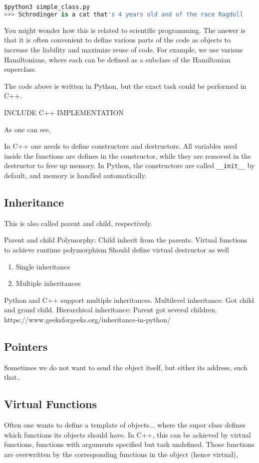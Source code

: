 \lstset{basicstyle=\scriptsize}
\begin{lstlisting}[language=python]
$python3 simple_class.py
>>> Schrodinger is a cat that's 4 years old and of the race Ragdoll
\end{lstlisting}

You might wonder how this is related to scientific programming. The answer is that it is often convenient to define various parts of the code as objects to increase the liability and maximize reuse of code. For example, we use various Hamiltonians, where each can be defined as a subclass of the Hamiltonian superclass. 

The code above is written in Python, but the exact task could be performed in C++. 

INCLUDE C++ IMPLEMENTATION

As one can see, 

In C++ one needs to define constructors and destructors. All variables used inside the functions are defines in the constructor, while they are removed in the destructor to free up memory.  In Python, the constructors are called \texttt{\_\_init\_\_} by default, and memory is handled automatically.

\subsection{Inheritance}
This is also called parent and child, respectively. 

Parent and child
Polymorphy: Child inherit from the parents. 
Virtual functions to achieve runtime polymorphism 
Should define virtual destructor as well 

\begin{enumerate}
	\item Single inheritance
	\item Multiple inheritances
\end{enumerate}

Python and C++ support multiple inheritances. Multilevel inheritance: Got child and grand child. Hierarchical inheritance: Parent got several children. https://www.geeksforgeeks.org/inheritance-in-python/

\subsection{Pointers}
Sometimes we do not want to send the object itself, but either its address, such that..

\subsection{Virtual Functions}
Often one wants to define a template of objects... where the super class defines which functions its objects should have. In C++, this can be achieved by virtual functions, functions with arguments specified but task undefined. Those functions are overwritten by the corresponding functions in the object (hence virtual), 